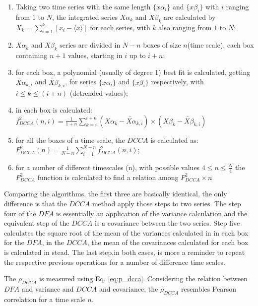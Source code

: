 \documentclass[article]{jss}
\begin{document}
\begin{enumerate}
  \label{steps:DCCA}
  \item Taking two time series with the same length $\{x\alpha_{i}\}$ and \(\{x\beta_{i}\}\) with \(i\) ranging from \(1\) to \(N\),
        the integrated series \(X\alpha_{k}\) and \(X\beta_{k}\) are calculated by
        \(X_{k} = \sum_{i=1}^{k}\left[x_{i} - \langle x \rangle \right] \) for each series, with \(k\) also ranging from \(1\) to \(N\);
  \item \(X\alpha_{k}\) and \(X\beta_{k}\) series are divided in \(N - n\) boxes of size \(n\)(time scale), each box containing \(n + 1\) values, starting in \(i\) up to \(i + n\);
  \item for each box, a polynomial (usually of degree 1) best fit is calculated, getting
        $\widetilde{X\alpha}_{k, i}$ and $\widetilde{X\beta}_{k, i}$,
        for series $\{x\alpha_{i}\}$ and $\{x\beta_{i}\}$ respectively,
        with \( i \le k \le (i + n) \) (detrended values);
  \item in each box is calculated: $f_{DCCA}^{2}(n, i) =
          \frac{1}{1+n} \sum_{k=i}^{i + n}(X\alpha_{k}-\widetilde{X\alpha}_{k, i}) \times (X\beta_{k}-\widetilde{X\beta}_{k, i})$
  \item for all the boxes of a time scale, the $DCCA$ is calculated as:\\[10pt]
        $F_{DCCA}^{2}(n) =\frac{1}{N - n} \sum_{i=1}^{N-n} f_{DCCA}^{2}(n, i)$;
  \item for a number of different timescales (n), with possible values
        $4 \le n \le \frac{N}{4}$ the $F_{DCCA}^{2}$ function is calculated to find a relation among
        $F_{DCCA}^{2} \times n$
\end{enumerate}

Comparing the algorithms, the first three are basically identical, the only difference is that the $DCCA$ method apply those steps to two series. The step four of the $DFA$ is essentially an application of the variance calculation and the equivalent step of the $DCCA$ is a covariance between the two series. Step five calculates the square root of the mean of the variances calculated in  in each box for the $DFA$, in the $DCCA$, the mean of the covariances calculated for each box is calculated in stead. The last step,in both cases, is more a reminder to repeat the respective previous operations for a number of difference time scales.

The $\rho_{DCCA}$ is measured using Eq. \ref{eq:p_dcca}. Considering the relation between $DFA$ and variance and $DCCA$ and covariance, the $\rho_{DCCA}$ resembles Pearson correlation for a time scale $n$.
\end{document}
